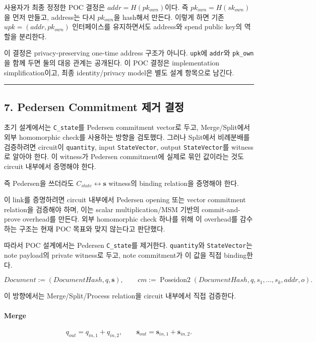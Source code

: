 \documentclass[11pt]{extarticle}
\DeclareMathOperator{\PoseidonTwo}{Poseidon2}
\begin{document}
사용자가 최종 정정한 POC 결정은 $addr=H(pk_{own})$이다. 즉
$pk_{own}=H(sk_{own})$을 먼저 만들고, address는 다시
$pk_{own}$을 hash해서 만든다. 이렇게 하면 기존
$upk=(addr,pk_{own})$ 인터페이스를 유지하면서도 address와
spend public key의 역할을 분리한다.

이 결정은 privacy-preserving one-time address 구조가 아니다.
\texttt{upk}에 \texttt{addr}와 \texttt{pk\_own}을 함께 두면 둘의 대응
관계는 공개된다. 이 POC 결정은 implementation simplification이고, 최종
identity/privacy model은 별도 설계 항목으로 남긴다.

\begin{center}\rule{0.5\linewidth}{0.5pt}\end{center}

\subsection{7. Pedersen Commitment 제거
결정}\label{7-pedersen-commitment-uxc81cuxac70-uxacb0uxc815}

초기 설계에서는 \texttt{C\_state}를 Pedersen commitment vector로 두고,
Merge/Split에서 외부 homomorphic check를 사용하는 방향을 검토했다.
그러나 Split에서 비례분배를 검증하려면 circuit이 \texttt{quantity},
input \texttt{StateVector}, output \texttt{StateVector}를 witness로
알아야 한다. 이 witness가 Pedersen commitment에 실제로 묶인 값이라는
것도 circuit 내부에서 증명해야 한다.

즉 Pedersen을 쓰더라도 $C_{state}\leftrightarrow\mathbf{s}$ witness의
binding relation을 증명해야 한다.

이 link를 증명하려면 circuit 내부에서 Pedersen opening 또는 vector
commitment relation을 검증해야 하며, 이는 scalar multiplication/MSM
기반의 commit-and-prove overhead를 만든다. 외부 homomorphic check 하나를
위해 이 overhead를 감수하는 구조는 현재 POC 목표와 맞지 않는다고
판단했다.

따라서 POC 설계에서는 Pedersen \texttt{C\_state}를 제거한다.
\texttt{quantity}와 \texttt{StateVector}는 note payload의 private
witness로 두고, note commitment가 이 값을 직접 binding한다.

\[
\mathit{Document}:=(\mathit{DocumentHash},q,\mathbf{s}),
\qquad
cm:=\PoseidonTwo(\mathit{DocumentHash},q,s_1,\ldots,s_k,addr,o).
\]

이 방향에서는 Merge/Split/Process relation을 circuit 내부에서 직접
검증한다.

\paragraph{Merge}
\[
q_{out}=q_{in,1}+q_{in,2},
\qquad
\mathbf{s}_{out}=\mathbf{s}_{in,1}+\mathbf{s}_{in,2}.
\]
\end{document}
